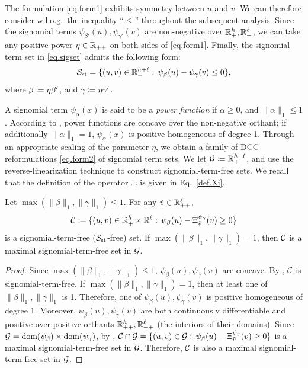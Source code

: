 The formulation \eqref{eq.form1} exhibits symmetry between $u$ and $v$.  We can therefore consider w.l.o.g.~the inequality ``$\le$'' throughout the subsequent analysis.
Since the signomial terms $\psi_{\beta'}(u), \psi_{\gamma'}(v)$
are non-negative over $\mathbb R_{+}^h, \mathbb R_{+}^\ell$, we can take any positive power $\eta \in \mathbb R_{++}$ on both sides of \eqref{eq.form1}.  Finally, the signomial  term set in \eqref{eq.sigset} admits the following form:
\begin{equation}
\label{eq.form2}
	\mathcal S_{\mathrm{st}} =  \{(u, v) \in \mathbb R_{+}^{h + \ell}:\, \psi_{\beta}(u) - \psi_{\gamma}(v) \le 0\},
\end{equation}
where $\beta \coloneqq \eta \beta'$, and $\gamma \coloneqq \eta \gamma'$.

A signomial term $\psi_{\alpha}(x)$ is said to be a \emph{power function} if $\alpha \ge 0$, and $\lVert \alpha \rVert_1 \le 1$. According to \cite{aps2018mosek,chares2009cones}, power functions are concave over the non-negative orthant; if additionally $\lVert \alpha \rVert_1 = 1$, $\psi_{\alpha}(x)$ is positive  homogeneous of degree 1. Through an appropriate scaling of the parameter $\eta$, we obtain a family of DCC reformulations \eqref{eq.form2} of signomial term sets. We let $\mathcal G\coloneqq  \mathbb R_{+}^{h + \ell}$, and use the reverse-linearization technique  to construct signomial-term-free sets. We recall that the definition of the operator $\Xi$ is given in Eq.~\eqref{def.Xi}.
\begin{proposition}
\label{prop.maxsig}
Let $\max(\lVert \beta \rVert_1, \lVert \gamma \rVert_1 ) \le  1$. For any $\tilde{v} \in \mathbb R^{\ell}_{++}$, \begin{equation}
\label{eq.sigfree}
	\mathcal C \coloneqq  \{(u, v) \in \mathbb R_{+}^h \times \mathbb R^{\ell}:\, \psi_{\beta}(u) - {\Xi^{\psi_{\gamma}}_{\tilde{v}}}(v) \ge 0\}
\end{equation} is a signomial-term-free ($\mathcal S_{\mathrm{st}}$-free) set.   If $\max(\lVert \beta \rVert_1, \lVert \gamma \rVert_1 ) = 1$, then $\mathcal C$ is a maximal signomial-term-free set in $\mathcal G$.
 \end{proposition}
 \begin{proof}
Since $ \max(\lVert \beta \rVert_1, \lVert \gamma \rVert_1 ) \le 1 $,  $ \psi_{\beta}(u), \psi_{\gamma}(v)$ are concave. By , $\mathcal C$ is signomial-term-free. If $\max(\lVert \beta \rVert_1, \lVert \gamma \rVert_1 ) = 1$, then  at least one of $\lVert \beta \rVert_1,  \lVert \gamma \rVert_1$ is 1. Therefore, one of $\psi_{\beta}(u), \psi_{\gamma}( v)$ is positive  homogeneous of degree 1.  Moreover, $\psi_{\beta}(u), \psi_{\gamma}( v)$ are both continuously differentiable and positive over positive orthants $\mathbb R^h_{++},\mathbb R^{\ell}_{++}$ (the interiors of their domains). Since $\mathcal G = \operatorname{dom}(\psi_{\beta}) \times  \operatorname{dom}(\psi_{\gamma})$,  by , $\mathcal C \cap \mathcal G= \{(u, v) \in \mathcal G:\, \psi_{\beta}(u) - {\Xi^{\psi_{\gamma}}_{\tilde{v}}}(v) \ge 0\}$  is  a maximal signomial-term-free set in $\mathcal G$. Therefore, $\mathcal C$ is also a maximal signomial-term-free set in $\mathcal G$.
 \end{proof}
 
